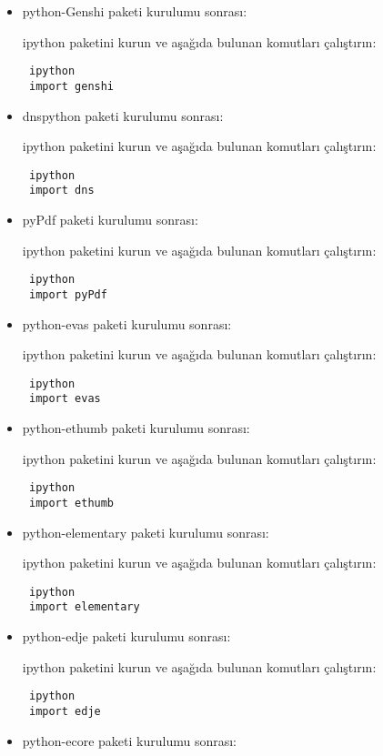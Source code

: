 \documentclass[a4paper,10pt]{article}
\begin{document}
\begin{itemize}
\item python-Genshi paketi kurulumu sonrası:

ipython paketini kurun ve aşağıda bulunan komutları çalıştırın:
\begin{verbatim}
 ipython
 import genshi
\end{verbatim}

\item dnspython paketi kurulumu sonrası:

ipython paketini kurun ve aşağıda bulunan komutları çalıştırın:
\begin{verbatim}
 ipython
 import dns
\end{verbatim}
\item pyPdf paketi kurulumu sonrası:

ipython paketini kurun ve aşağıda bulunan komutları çalıştırın:
\begin{verbatim}
 ipython
 import pyPdf
\end{verbatim}

\item python-evas paketi kurulumu sonrası:

ipython paketini kurun ve aşağıda bulunan komutları çalıştırın:
\begin{verbatim}
 ipython
 import evas
\end{verbatim}

\item python-ethumb paketi kurulumu sonrası:

ipython paketini kurun ve aşağıda bulunan komutları çalıştırın:
\begin{verbatim}
 ipython
 import ethumb
\end{verbatim}

\item python-elementary paketi kurulumu sonrası:

ipython paketini kurun ve aşağıda bulunan komutları çalıştırın:
\begin{verbatim}
 ipython
 import elementary
\end{verbatim}

\item python-edje paketi kurulumu sonrası:

ipython paketini kurun ve aşağıda bulunan komutları çalıştırın:
\begin{verbatim}
 ipython
 import edje
\end{verbatim}



\item python-ecore paketi kurulumu sonrası:


\end{itemize}
\end{document}
